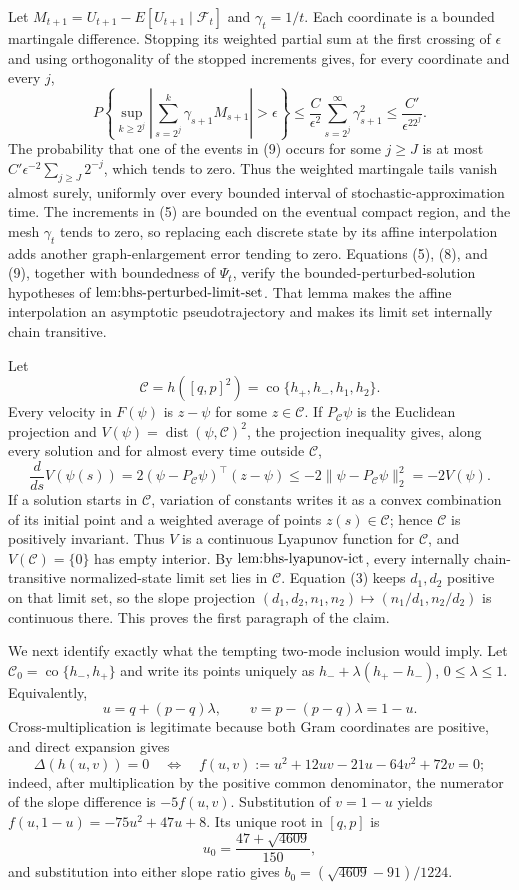 Let \(M_{t+1}=U_{t+1}-E[U_{t+1}\mid\mathcal F_t]\) and \(\gamma_t=1/t\).  Each coordinate is a bounded martingale difference.  Stopping its weighted partial sum at the first crossing of \(\epsilon\) and using orthogonality of the stopped increments gives, for every coordinate and every \(j\),
\[
 P\left\{\sup_{k\geq2^j}\left|\sum_{s=2^j}^k\gamma_{s+1}M_{s+1}\right|>\epsilon\right\}
 \leq \frac{C}{\epsilon^2}\sum_{s=2^j}^{\infty}\gamma_{s+1}^2
 \leq\frac{C'}{\epsilon^22^j}. \tag{9}
\]
The probability that one of the events in (9) occurs for some \(j\geq J\) is at most \(C'\epsilon^{-2}\sum_{j\geq J}2^{-j}\), which tends to zero.  Thus the weighted martingale tails vanish almost surely, uniformly over every bounded interval of stochastic-approximation time.  The increments in (5) are bounded on the eventual compact region, and the mesh \(\gamma_t\) tends to zero, so replacing each discrete state by its affine interpolation adds another graph-enlargement error tending to zero.  Equations (5), (8), and (9), together with boundedness of \(\Psi_t\), verify the bounded-perturbed-solution hypotheses of \(\textnormal{lem:bhs-perturbed-limit-set}\).  That lemma makes the affine interpolation an asymptotic pseudotrajectory and makes its limit set internally chain transitive.

Let
\[
 \mathcal C=h([q,p]^2)=\operatorname{co}\{h_+,h_-,h_1,h_2\}.
\]
Every velocity in \(F(\psi)\) is \(z-\psi\) for some \(z\in\mathcal C\).  If \(P_{\mathcal C}\psi\) is the Euclidean projection and \(V(\psi)=\operatorname{dist}(\psi,\mathcal C)^2\), the projection inequality gives, along every solution and for almost every time outside \(\mathcal C\),
\[
 \frac{d}{ds}V(\psi(s))
 =2(\psi-P_{\mathcal C}\psi)^\top(z-\psi)
 \leq-2\|\psi-P_{\mathcal C}\psi\|_2^2=-2V(\psi). \tag{10}
\]
If a solution starts in \(\mathcal C\), variation of constants writes it as a convex combination of its initial point and a weighted average of points \(z(s)\in\mathcal C\); hence \(\mathcal C\) is positively invariant.  Thus \(V\) is a continuous Lyapunov function for \(\mathcal C\), and \(V(\mathcal C)=\{0\}\) has empty interior.  By \(\textnormal{lem:bhs-lyapunov-ict}\), every internally chain-transitive normalized-state limit set lies in \(\mathcal C\).  Equation (3) keeps \(d_1,d_2\) positive on that limit set, so the slope projection \((d_1,d_2,n_1,n_2)\mapsto(n_1/d_1,n_2/d_2)\) is continuous there.  This proves the first paragraph of the claim.

We next identify exactly what the tempting two-mode inclusion would imply.  Let \(\mathcal C_0=\operatorname{co}\{h_-,h_+\}\) and write its points uniquely as \(h_-+\lambda(h_+-h_-)\), \(0\leq\lambda\leq1\).  Equivalently,
\[
 u=q+(p-q)\lambda,\qquad v=p-(p-q)\lambda=1-u. \tag{11}
\]
Cross-multiplication is legitimate because both Gram coordinates are positive, and direct expansion gives
\[
 \Delta(h(u,v))=0
 \quad\Longleftrightarrow\quad
 f(u,v):=u^2+12uv-21u-64v^2+72v=0; \tag{12}
\]
indeed, after multiplication by the positive common denominator, the numerator of the slope difference is \(-5f(u,v)\).  Substitution of \(v=1-u\) yields \(f(u,1-u)=-75u^2+47u+8\).  Its unique root in \([q,p]\) is
\[
 u_0=\frac{47+\sqrt{4609}}{150},
\]
and substitution into either slope ratio gives \(b_0=(\sqrt{4609}-91)/1224\).

